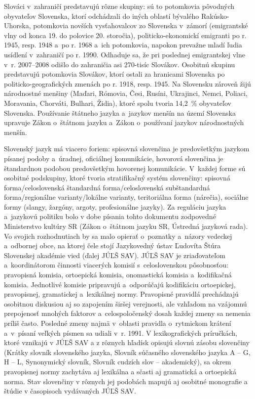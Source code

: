 \begin{multicols}{2}

Slováci v~zahraničí predstavujú rôzne skupiny: sú to potomkovia pôvodných obyvateľov Slovenska, ktorí odchádzali do iných oblastí bývalého Rakúsko-Uhorska, potomkovia novších vysťahovalcov zo Slovenska v~zámorí (emigrantské vlny od konca 19. do polovice 20. storočia), politicko-ekonomickí emigranti po r. 1945, resp. 1948 a~po r. 1968 a~ich potomkovia, napokon prevažne mladí ľudia usídlení v~zahraničí po r. 1990. Odhaduje sa, že pri poslednej emigrantskej vlne v~r. 2007–2008 odišlo do zahraničia asi 270-tisíc Slovákov. Osobitnú skupinu predstavujú potomkovia Slovákov, ktorí ostali za hranicami Slovenska po politicko-geografických zmenách po r. 1918, resp. 1945. Na Slovensku zároveň žijú národnostné menšiny (Maďari, Rómovia, Česi, Rusíni, Ukrajinci, Nemci, Poliaci, Moravania, Chorváti, Bulhari, Židia), ktoré spolu tvoria 14,2~\% obyvateľov Slovenska. Používanie štátneho jazyka a~jazykov menšín na území Slovenska upravuje Zákon o~štátnom jazyku a~Zákon o~používaní jazykov národnostných menšín.

Slovenský jazyk má viacero foriem: spisovná slovenčina je predovšetkým jazykom písanej podoby a~úradnej, oficiálnej komunikácie, hovorová slovenčina je štandardnou podobou predovšetkým hovorenej komunikácie. V~každej forme sú osobitné podskupiny, ktoré tvoria stratifikačný systém slovenčiny: spisovná forma/celoslovenská štandardná forma/celoslovenská subštandardná forma/regionálne varianty/lokálne varianty, teritoriálna forma (nárečia), sociálne formy (slangy, žargóny, argoty, profesionálne jazyky). Za reguláciu jazyka a~jazykovú politiku bolo v dobe písania tohto dokumentu zodpovedné Ministerstvo kultúry SR (Zákon o~štátnom jazyku SR, Ústredná jazyková rada). Vo svojich rozhodnutiach by sa malo opierať o~poznatky a~názory vedeckej a~odbornej obce, na ktorej čele stojí Jazykovedný ústav Ľudovíta Štúra Slovenskej akadémie vied (ďalej JÚĽŠ SAV).
JÚĽŠ SAV je zriaďovateľom a~koordinátorom činnosti viacerých komisií s~celoslovenskou pôsobnosťou: pravopisná komisia, ortoepická komisia, onomastická komisia a~kodifikačná komisia. Jednotlivé komisie pripravujú a~odporúčajú kodifikáciu ortoepickej, pravopisnej, gramatickej a~lexikálnej normy. Pravopisné pravidlá prechádzajú osobitnou diskusiou aj so zapojením širšej verejnosti, ale vzhľadom na vzájomnú prepojenosť mnohých faktorov a~celospoločenský dosah každej zmeny sa nemenia príliš často. Posledné zmeny najmä v~oblasti pravidla o~rytmickom krátení a~v~písaní veľkých písmen sa udiali v~r. 1991. V lexikografických príručkách, ktoré vznikajú v JÚĽŠ SAV a z rôznych hľadísk opisujú slovnú zásobu slovenčiny (Krátky slovník slovenského jazyka, Slovník súčasného slovenského jazyka A -- G, H -- L, Synonymický slovník, Slovník cudzích slov -- akademický\cite{kssj2003,sssj2006,sssj2011,sss2004,scs2005}), sa okrem pravopisnej normy zachytáva aj lexikálna a sčasti aj gramatická a ortoepická norma. Stav slovenčiny v rôznych jej podobách mapujú aj osobitné monografie a štúdie v časopisoch vydávaných JÚĽŠ SAV.


\end{multicols}
